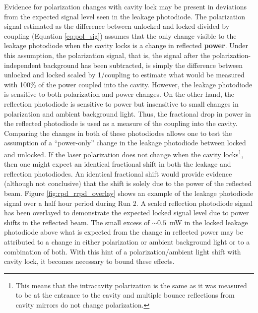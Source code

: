 Evidence for polarization changes with cavity lock may be present in deviations from the expected signal level seen in the leakage photodiode. The polarization signal estimated as the difference between unlocked and locked divided by coupling (Equation \ref{eq:pol_sig}) assumes that the only change visible to the leakage photodiode when the cavity locks is a change in reflected {\bf power}. Under this assumption, the polarization signal, that is, the signal after the polarization-independent background has been subtracted, is simply the difference between unlocked and locked scaled by 1/coupling to estimate what would be measured with 100\% of the power coupled into the cavity. However, the leakage photodiode is sensitive to both polarization and power changes. On the other hand, the reflection photodiode is sensitive to power but insensitive to small changes in polarization and ambient background light. Thus, the fractional drop in power in the reflected photodiode is used as a measure of the coupling into the cavity. Comparing the changes in both of these photodiodes allows one to test the assumption of a ``power-only'' change in the leakage photodiode between locked and unlocked. If the laser polarization does not change when the cavity locks\footnote{This means that the intracavity polarization is the same as it was measured to be at the entrance to the cavity and multiple bounce reflections from cavity mirrors do not change polarization.}, then one might expect an identical fractional shift in both the leakage and reflection photodiodes. An identical fractional shift would provide evidence (although not conclusive) that the shift is solely due to the power of the reflected beam. Figure \ref{fig:rpd_rrpd_overlay} shows an example of the leakage photodiode signal over a half hour period during Run 2. A scaled reflection photodiode signal has been overlayed to demonstrate the expected locked signal level due to power shifts in the reflected beam. The small excess of $\sim0.5$~mW in the locked leakage photodiode above what is expected from the change in reflected power may be attributed to a change in either polarization or ambient background light or to a combination of both. With this hint of a polarization/ambient light shift with cavity lock, it becomes necessary to bound these effects.
 
